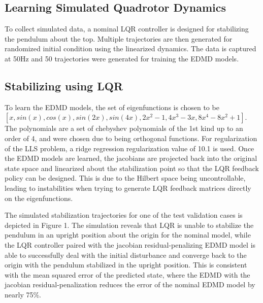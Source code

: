 \documentclass{article}
\begin{document}
    \subsection{Learning Simulated Quadrotor Dynamics}

    To collect simulated data, a nominal LQR controller is designed for stabilizing the pendulum about the top. Multiple trajectories are then generated for randomized initial condition using the linearized dynamics. The data is captured at 50Hz and 50 trajectories were generated for training the EDMD models.
    
\subsection{Stabilizing using LQR}
    
    To learn the EDMD models, the set of eigenfunctions is chosen to be $[x, sin(x), cos(x), sin(2x), sin(4x), 2x^{2} - 1, 4x^{3} - 3x, 8x^{4} - 8x^{2} + 1]$. The polynomials are a set of chebyshev polynomials of the 1st kind up to an order of 4, and were chosen due to being orthogonal functions. For regularization of the LLS problem, a ridge regression regularization value of 10.1 is used. Once the EDMD models are learned, the jacobians are projected back into the original state space and linearized about the stabilization point so that the LQR feedback policy can be designed. This is due to the Hilbert space being uncontrollable, leading to instabilities when trying to generate LQR feedback matrices directly on the eigenfunctions.
    
    The simulated stabilization trajectories for one of the test validation cases is depicted in Figure 1. The simulation reveals that LQR is unable to stabilize the pendulum in an upright position about the origin for the nominal model, while the LQR controller paired with the jacobian residual-penalizing EDMD model is able to successfully deal with the initial disturbance and converge back to the origin with the pendulum stabilized in the upright position. This is consistent with the mean squared error of the predicted state, where the EDMD with the jacobian residual-penalization reduces the error of the nominal EDMD model by nearly 75\%.
    
    
\end{document}
